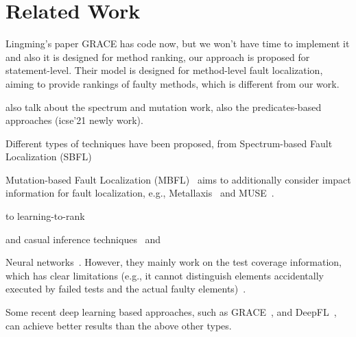 \section{Related Work}


Lingming's paper GRACE has code now, but we won't have time to implement it and also it is designed for method ranking, our approach is proposed for statement-level. Their model is designed for method-level fault localization, aiming to provide rankings of faulty methods, which is different from our work.

also talk about the spectrum and mutation work, also the predicates-based approaches (icse'21 newly work).



Different types of techniques have been proposed, from Spectrum-based Fault Localization (SBFL)~\cite{zhang2011localizing, abreu2007accuracy, jones2005empirical, abreu2006evaluation, naish2011model, wong2007effective, liblit2005scalable, lucia2014extended}


Mutation-based Fault Localization (MBFL)~\cite{MUSE, zhang2013injecting, budd1981mutation, zhang2010test, musco2017large} 
aims to additionally consider impact information for fault localization, e.g., Metallaxis~\cite{papadakis2015metallaxis} and MUSE~\cite{MUSE}. 


to learning-to-rank~\cite{MULTRIC,TraPT,b2016learning,sohn2017fluccs} 


and casual inference techniques~\cite{kuccuk2021improving} and 



Neural networks~\cite{zheng2016fault, briand2007using, zhang2017deep, wong2009bp}.  However, they mainly work on the test coverage information, which has clear limitations (e.g., it cannot distinguish elements accidentally executed by failed tests and the actual faulty elements)~\cite{TraPT}. 


Some recent deep learning based approaches, such as GRACE~\cite{lou2021boosting}, and DeepFL~\cite{DeepFL}, can achieve better results than the above other types. 
